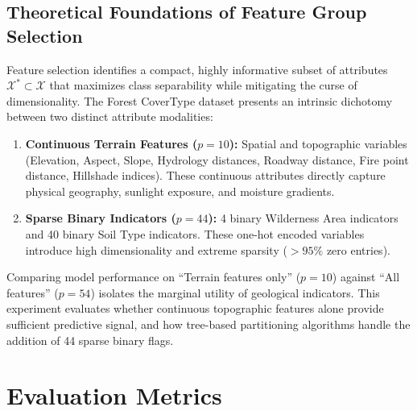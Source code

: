\subsection{Theoretical Foundations of Feature Group Selection}
\label{sec:theory_feature_group}

Feature selection identifies a compact, highly informative subset of attributes $\mathcal{X}^* \subset \mathcal{X}$ that maximizes class separability while mitigating the curse of dimensionality. The Forest CoverType dataset presents an intrinsic dichotomy between two distinct attribute modalities:
\begin{enumerate}
    \item \textbf{Continuous Terrain Features ($p=10$):} Spatial and topographic variables (Elevation, Aspect, Slope, Hydrology distances, Roadway distance, Fire point distance, Hillshade indices). These continuous attributes directly capture physical geography, sunlight exposure, and moisture gradients.
    \item \textbf{Sparse Binary Indicators ($p=44$):} 4 binary Wilderness Area indicators and 40 binary Soil Type indicators. These one-hot encoded variables introduce high dimensionality and extreme sparsity ($>95\%$ zero entries).
\end{enumerate}
Comparing model performance on ``Terrain features only'' ($p=10$) against ``All features'' ($p=54$) isolates the marginal utility of geological indicators. This experiment evaluates whether continuous topographic features alone provide sufficient predictive signal, and how tree-based partitioning algorithms handle the addition of 44 sparse binary flags.

\section{Evaluation Metrics}
\label{sec:evaluation_metrics}

